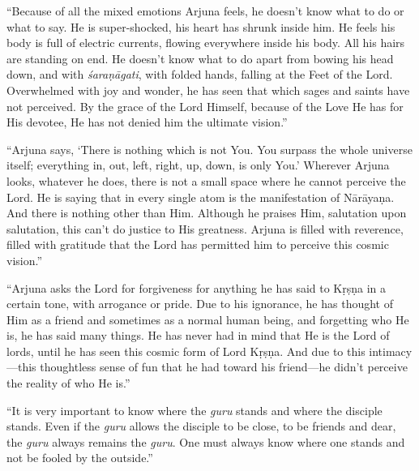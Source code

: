 \documentclass[12pt, twoside, openright]{memoir}
\begin{document}
\enquote{Because of all the mixed emotions Arjuna feels, he doesn’t know what to do or what to say. He is super-shocked, his heart has shrunk inside him. He feels his body is full of electric currents, flowing everywhere inside his body. All his hairs are standing on end. He doesn’t know what to do apart from bowing his head down, and with \textit{śaraṇāgati}, with folded hands, falling at the Feet of the Lord. Overwhelmed with joy and wonder, he has seen that which sages and saints have not perceived. By the grace of the Lord Himself, because of the Love He has for His devotee, He has not denied him the ultimate vision.}

\enquote{Arjuna says, \enquote{There is nothing which is not You. You surpass the whole universe itself; everything in, out, left, right, up, down, is only You.} Wherever Arjuna looks, whatever he does, there is not a small space where he cannot perceive the Lord. He is saying that in every single atom is the manifestation of Nārāyaṇa. And there is nothing other than Him. Although he praises Him, salutation upon salutation, this can’t do justice to His greatness. Arjuna is filled with reverence, filled with gratitude that the Lord has permitted him to perceive this cosmic vision.}

\enquote{Arjuna asks the Lord for forgiveness for anything he has said to Kṛṣṇa in a certain tone, with arrogance or pride. Due to his ignorance, he has thought of Him as a friend and sometimes as a normal human being, and forgetting who He is, he has said many things. He has never had in mind that He is the Lord of lords, until he has seen this cosmic form of Lord Kṛṣṇa. And due to this intimacy---this thoughtless sense of fun that he had toward his friend---he didn’t perceive the reality of who He is.}

\enquote{It is very important to know where the \textit{guru} stands and where the disciple stands. Even if the \textit{guru} allows the disciple to be close, to be friends and dear, the \textit{guru} always remains the \textit{guru}. One must always know where one stands and not be fooled by the outside.}
\end{document}
